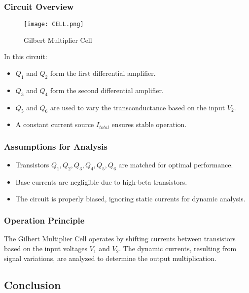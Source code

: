 \documentclass[a4paper,9pt,twoside,openany,twocolumn]{memoir}
\begin{document}
\subsubsection{Circuit Overview}

\begin{figure}[h]
    \centering
    \texttt{[image: CELL.png]}
    \caption{Gilbert Multiplier Cell}
    \label{fig:gilbert_multiplier}
\end{figure}

In this circuit:

\begin{itemize}
    \item \( Q_1 \) and \( Q_2 \) form the first differential amplifier.
    \item \( Q_3 \) and \( Q_4 \) form the second differential amplifier.
    \item \( Q_5 \) and \( Q_6 \) are used to vary the transconductance based on the input \( V_2 \).
    \item A constant current source \( I_{total} \) ensures stable operation.
\end{itemize}

\subsubsection{Assumptions for Analysis}

\begin{itemize}
    \item Transistors \( Q_1, Q_2, Q_3, Q_4, Q_5, Q_6 \) are matched for optimal performance.
    \item Base currents are negligible due to high-beta transistors.
    \item The circuit is properly biased, ignoring static currents for dynamic analysis.
\end{itemize}

\subsubsection{Operation Principle}

The Gilbert Multiplier Cell operates by shifting currents between transistors based on the input voltages \( V_1 \) and \( V_2 \). The dynamic currents, resulting from signal variations, are analyzed to determine the output multiplication.

\subsection{Conclusion}
\end{document}
